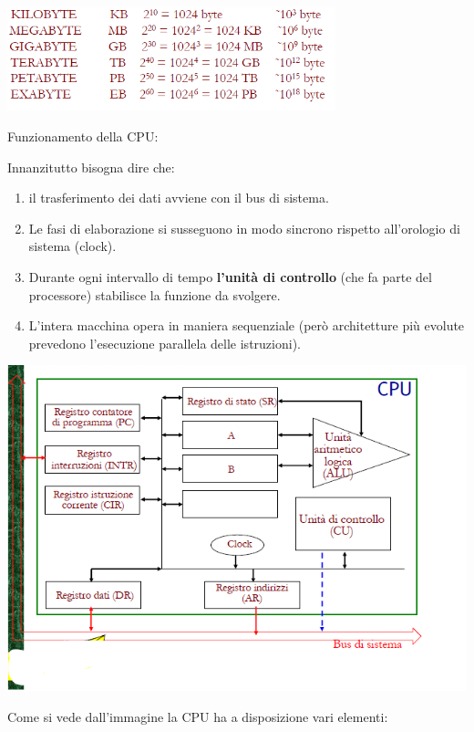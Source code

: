 \documentclass[
  paper=a4,
  oneside  ,captions=tableheading
]{scrbook}
\providecommand{\tightlist}{%
  \setlength{\itemsep}{0pt}\setlength{\parskip}{0pt}}
\begin{document}
\includegraphics[height=3cm]{./image/image-20201111184937248.png}

Funzionamento della CPU:

Innanzitutto bisogna dire che:

\begin{enumerate}
\def\labelenumi{\arabic{enumi}.}
\tightlist
\item
  il trasferimento dei dati avviene con il bus di sistema.
\item
  Le fasi di elaborazione si susseguono in modo sincrono rispetto
  all'orologio di sistema (clock).
\item
  Durante ogni intervallo di tempo \textbf{l'unità di controllo} (che fa
  parte del processore) stabilisce la funzione da svolgere.
\item
  L'intera macchina opera in maniera sequenziale (però architetture più
  evolute prevedono l'esecuzione parallela delle istruzioni).
\end{enumerate}

\includegraphics{./image/image-20201111191808017.png}

Come si vede dall'immagine la CPU ha a disposizione vari elementi:
\end{document}
